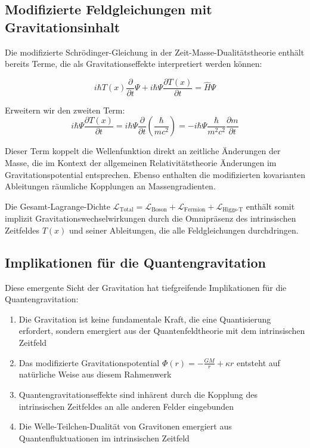 \documentclass{article}
\theoremstyle{definition}
\theoremstyle{remark}
\newcommand{\Tfield}{T(x)} %
\begin{document}
		\subsection{Modifizierte Feldgleichungen mit Gravitationsinhalt}
		
		Die modifizierte Schrödinger-Gleichung in der Zeit-Masse-Dualitätstheorie enthält bereits Terme, die als Gravitationseffekte interpretiert werden können:
		
		\begin{equation}
			i\hbar \Tfield\frac{\partial}{\partial t}\Psi + i\hbar\Psi\frac{\partial \Tfield}{\partial t} = \hat{H}\Psi
		\end{equation}
		
		Erweitern wir den zweiten Term:
		\begin{equation}
			i\hbar\Psi\frac{\partial \Tfield}{\partial t} = i\hbar\Psi\frac{\partial}{\partial t}\left(\frac{\hbar}{mc^2}\right) = -i\hbar\Psi\frac{\hbar}{m^2c^2}\frac{\partial m}{\partial t}
		\end{equation}
		
		Dieser Term koppelt die Wellenfunktion direkt an zeitliche Änderungen der Masse, die im Kontext der allgemeinen Relativitätstheorie Änderungen im Gravitationspotential entsprechen. Ebenso enthalten die modifizierten kovarianten Ableitungen räumliche Kopplungen an Massengradienten.
		
		Die Gesamt-Lagrange-Dichte $\mathcal{L}_{\text{Total}} = \mathcal{L}_{\text{Boson}} + \mathcal{L}_{\text{Fermion}} + \mathcal{L}_{\text{Higgs-T}}$ enthält somit implizit Gravitationswechselwirkungen durch die Omnipräsenz des intrinsischen Zeitfeldes $\Tfield$ und seiner Ableitungen, die alle Feldgleichungen durchdringen.
		
		\subsection{Implikationen für die Quantengravitation}
		
		Diese emergente Sicht der Gravitation hat tiefgreifende Implikationen für die Quantengravitation:
		
		\begin{enumerate}
			\item Die Gravitation ist keine fundamentale Kraft, die eine Quantisierung erfordert, sondern emergiert aus der Quantenfeldtheorie mit dem intrinsischen Zeitfeld
			\item Das modifizierte Gravitationspotential $\Phi(r) = -\frac{GM}{r} + \kappa r$ entsteht auf natürliche Weise aus diesem Rahmenwerk
			\item Quantengravitationseffekte sind inhärent durch die Kopplung des intrinsischen Zeitfeldes an alle anderen Felder eingebunden
			\item Die Welle-Teilchen-Dualität von Gravitonen emergiert aus Quantenfluktuationen im intrinsischen Zeitfeld
		\end{enumerate}
		
\end{document}
